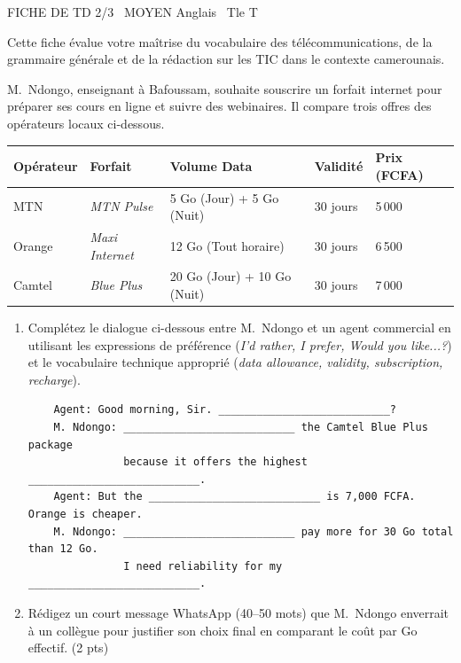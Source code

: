 \documentclass[11pt]{article}
\begin{document}
\begin{tcolorbox}[enhanced,colback=popink,colframe=popink,arc=10pt,boxrule=0pt,left=12pt,right=12pt,top=9pt,bottom=9pt]
{\color{white}\popxbold\small FICHE DE TD 2/3 \textbullet\ MOYEN \hfill Anglais \textbullet\ Tle T\par}
\end{tcolorbox}
\vspace{4pt}
Cette fiche évalue votre maîtrise du vocabulaire des télécommunications, de la grammaire générale et de la rédaction sur les TIC dans le contexte camerounais.

\begin{exercice}
M.~Ndongo, enseignant à Bafoussam, souhaite souscrire un forfait internet pour préparer ses cours en ligne et suivre des webinaires. Il compare trois offres des opérateurs locaux ci-dessous.

\begin{tabularx}{\linewidth}{@{}lXXXX@{}}
\toprule
\textbf{Opérateur} & \textbf{Forfait} & \textbf{Volume Data} & \textbf{Validité} & \textbf{Prix (FCFA)} \\
\midrule
MTN & \textit{MTN Pulse} & 5 Go (Jour) + 5 Go (Nuit) & 30 jours & 5\,000 \\
Orange & \textit{Maxi Internet} & 12 Go (Tout horaire) & 30 jours & 6\,500 \\
Camtel & \textit{Blue Plus} & 20 Go (Jour) + 10 Go (Nuit) & 30 jours & 7\,000 \\
\bottomrule
\end{tabularx}

\begin{enumerate}
    \item Complétez le dialogue ci-dessous entre M.~Ndongo et un agent commercial en utilisant les expressions de préférence (\textit{I'd rather, I prefer, Would you like...?}) et le vocabulaire technique approprié (\textit{data allowance, validity, subscription, recharge}).
    \begin{verbatim}
    Agent: Good morning, Sir. ___________________________?
    M. Ndongo: ___________________________ the Camtel Blue Plus package
               because it offers the highest ___________________________.
    Agent: But the ___________________________ is 7,000 FCFA. Orange is cheaper.
    M. Ndongo: ___________________________ pay more for 30 Go total than 12 Go.
               I need reliability for my ___________________________.
    \end{verbatim}
    \item Rédigez un court message WhatsApp (40--50 mots) que M.~Ndongo enverrait à un collègue pour justifier son choix final en comparant le coût par Go effectif. \hfill (2 pts)
\end{enumerate}
\end{exercice}
\end{document}
